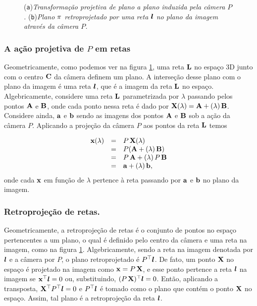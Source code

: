 \begin{figure}[htb!]
\centering
{}
\quad
{}
\caption{({\tt a})\textit{Transformação projetiva de plano a plano induzida pela câmera $P$.}\,\,({\tt b})\textit{Plano $\pi$ retroprojetado por uma reta $\boldsymbol{l}$ no plano da imagem através da câmera $P$.}}
\label{fig.projecao-planos-retas}
\end{figure}

\subsubsection{A ação projetiva de $P$ em retas}\label{sec.proj.retas}
Geometricamente, como podemos ver na figura \ref{fig.projecao-planos-retas}, uma reta ${\bf L}$ no espaço 3D junto com o centro ${\bf C}$ da câmera definem um plano. A interseção desse plano com o plano da imagem é uma reta $\boldsymbol{l}$, que é a imagem da reta ${\bf L}$ no espaço. Algebricamente, considere uma reta ${\bf L}$ parametrizada por $\lambda$ passando pelos pontos ${\bf A}$ e ${\bf B}$, onde cada ponto nessa reta é dado por $\mathbf{X}(\lambda)={\bf A}+(\lambda)\,{\bf B}$. Considere ainda, ${\bf a}$ e ${\bf b}$ sendo as imagens dos pontos ${\bf A}$ e ${\bf B}$ sob a ação da câmera $P$. Aplicando a projeção da câmera $P$ aos pontos da reta ${\bf L}$ temos

\begin{equation*}
\begin{array}{rcl}
\mathbf{x}(\lambda)&=&P\,\mathbf{X}(\lambda)\\
&=&P({\bf A}+(\lambda)\,{\bf B})\\
&=&P\,{\bf A}+(\lambda)\,P\,{\bf B}\\
&=&{\bf a}+(\lambda)\,{\bf b},
\end{array}
\end{equation*}
onde cada $\mathbf{x}$ em função de $\lambda$ pertence à reta passando por ${\bf a}$ e ${\bf b}$ no plano da imagem.  

\subsubsection*{Retroprojeção de retas.}
Geometricamente, a retroprojeção de retas é o conjunto de pontos no espaço pertencentes a um plano, o qual é definido pelo centro da câmera e uma reta na imagem, como na figura \ref{fig.projecao-planos-retas}. Algebricamente, sendo a reta na imagem denotada por $\boldsymbol{l}$ e a câmera por $P$, o plano retroprojetado é $P^\top\boldsymbol{l}$. De fato, um ponto $\mathbf{X}$ no espaço é projetado na imagem como $\mathbf{x}=P\,\mathbf{X}$, e esse ponto pertence a reta $\boldsymbol{l}$ na imagem se $\mathbf{x}^\top\boldsymbol{l}=0$ ou, substituindo, $(P\,\mathbf{X})^\top\boldsymbol{l}=0$. Então, aplicando a transposta, $\mathbf{X}^\top P^\top\boldsymbol{l}=0$ e $P^\top\boldsymbol{l}$ é tomado como o plano que contém o ponto $\mathbf{X}$ no espaço. Assim, tal plano é a retroprojeção da reta $\boldsymbol{l}$.  

